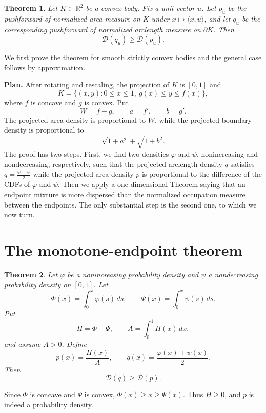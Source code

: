 \documentclass[final,12pt]{elsarticle}
\numberwithin{equation}{section}
\newtheorem{thm}{Theorem}[section]
\theoremstyle{remark}
\newcommand{\Gini}{\mathcal D}
\theoremstyle{definition}
\begin{document}
\begin{thm}\label{thm:main}
Let $K\subset\mathbb R^2$ be a convex body. Fix a unit vector $u$. Let $p_u$ be the pushforward of normalized area measure on $K$ under $x\mapsto\langle x,u\rangle$, and let $q_u$ be the corresponding pushforward of normalized arclength measure on $\partial K$. Then
\begin{equation}\label{eq:directional}
 \Gini(q_u)\ge \Gini(p_u).
\end{equation}
\end{thm}

We first prove the theorem for smooth strictly convex bodies and the general case follows by approximation.

\medskip
\noindent\textbf{Plan.}
After rotating and rescaling, the projection of $K$ is $[0,1]$ and
$$
 K=\{(x,y):0\le x\le1,\ g(x)\le y\le f(x)\},
$$
where $f$ is concave and $g$ is convex. Put
$$
 W=f-g,\qquad a=f',\qquad b=g'.
$$
The projected area density is proportional to $W$, while the projected boundary density is proportional to
$$
 \sqrt{1+a^2}+\sqrt{1+b^2}.
$$
The proof has two steps. First, we find two densities $\varphi$ and $\psi$, nonincreasing and nondecreasing, respectively, such that the projected arclength density $q$ satisfies $q = \frac{\varphi+\psi}{2}$ while the projected area density $p$ is proportional to the difference of the CDFs of $\varphi$ and $\psi$. Then we apply a one-dimensional Theorem saying that an endpoint mixture is more dispersed than the normalized occupation measure between the endpoints.
The only substantial step is the second one, to which we now turn.

\section{The monotone-endpoint theorem}

\begin{thm}
    \label{thm:endpoint}
Let $\varphi$ be a nonincreasing probability density and $\psi$ a nondecreasing probability density on $[0,1]$. Let
$$
 \Phi(x)=\int_0^x\varphi(s)\,ds,
 \qquad
 \Psi(x)=\int_0^x\psi(s)\,ds.
$$
Put
$$
 H=\Phi-\Psi,
 \qquad
 A=\int_0^1H(x)\,dx,
$$
and assume $A>0$. Define
$$
 p(x)=\frac{H(x)}A,
 \qquad
 q(x)=\frac{\varphi(x)+\psi(x)}2.
$$
Then
$$
 \Gini(q)\ge \Gini(p).
$$
\end{thm}

 Since $\Phi$ is concave and $\Psi$ is convex, $\Phi(x)\ge x \ge \Psi(x)$.
 Thus $H\ge0$, and $p$ is indeed a probability density.
\end{document}
